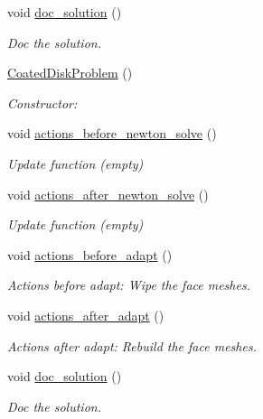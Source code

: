 \begin{DoxyCompactItemize}
void \hyperlink{classCoatedDiskProblem_af8e103d494f526c0e24c0c4ccef4ea6b}{doc\+\_\+solution} ()
\begin{DoxyCompactList}\small\item\em Doc the solution. \end{DoxyCompactList}\item 
\hyperlink{classCoatedDiskProblem_a9585ca5b422c72dc2b91cbb3e311b736}{Coated\+Disk\+Problem} ()
\begin{DoxyCompactList}\small\item\em Constructor\+: \end{DoxyCompactList}\item 
void \hyperlink{classCoatedDiskProblem_a3b94aaddee6a8f386ba249f418813963}{actions\+\_\+before\+\_\+newton\+\_\+solve} ()
\begin{DoxyCompactList}\small\item\em Update function (empty) \end{DoxyCompactList}\item 
void \hyperlink{classCoatedDiskProblem_aa0b9b4e706cdb1b31738c3db8759e9ee}{actions\+\_\+after\+\_\+newton\+\_\+solve} ()
\begin{DoxyCompactList}\small\item\em Update function (empty) \end{DoxyCompactList}\item 
void \hyperlink{classCoatedDiskProblem_a89e972df172b024b1358f0fac7646d6d}{actions\+\_\+before\+\_\+adapt} ()
\begin{DoxyCompactList}\small\item\em Actions before adapt\+: Wipe the face meshes. \end{DoxyCompactList}\item 
void \hyperlink{classCoatedDiskProblem_a93f9d34cd24f08ca1ec726ae0057b939}{actions\+\_\+after\+\_\+adapt} ()
\begin{DoxyCompactList}\small\item\em Actions after adapt\+: Rebuild the face meshes. \end{DoxyCompactList}\item 
void \hyperlink{classCoatedDiskProblem_af8e103d494f526c0e24c0c4ccef4ea6b}{doc\+\_\+solution} ()
\begin{DoxyCompactList}\small\item\em Doc the solution. \end{DoxyCompactList}\end{DoxyCompactItemize}
